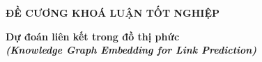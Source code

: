 \documentclass{article}[14pt]
\begin{document}
    \begin{figure}[h]
        \begin{floatrow}
        {%
    
        }
        {%
    
        }
        \end{floatrow}
    \end{figure}
    
    \begin{center}
        
        \textbf{\Large ĐỀ CƯƠNG KHOÁ LUẬN TỐT NGHIỆP} \\ 
    \end{center}
    
    
    \begin{center}
        
        \textbf{\huge Dự đoán liên kết trong đồ thị phức} 
        \\
        
    \vspace{.5cm}
        \textit{\textbf{\Large (Knowledge Graph Embedding for Link Prediction)}}
    \end{center}
    
\end{document}

